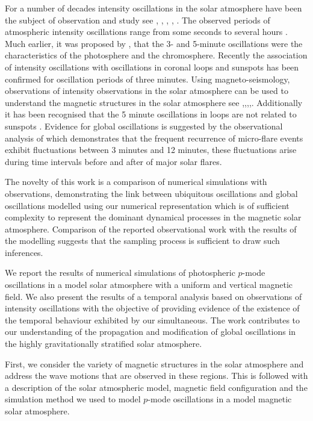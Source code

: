 \documentclass[linenumbers]{aastex63}
\begin{document}
For a number of decades intensity oscillations in the solar atmosphere have been the subject of observation and study see \citet{Banerjee2011}, \citet{deMoortel2009}, \citet{Mathioudakis2013}, \citet{Ruderman2009}, \citet{Wang2011}. The observed periods of atmospheric intensity oscillations range from some seconds to several hours \citet{Auchere2014}. Much earlier, it was proposed by \citet{Jensen1963}, that the 3- and 5-minute oscillations were the characteristics of the photosphere and the chromosphere. Recently the association of intensity oscillations with oscillations in coronal loops and sunspots has been confirmed for oscillation periods of three minutes. Using magneto-seismology, observations of intensity observations in the solar atmosphere can be used to understand the magnetic structures in the solar atmosphere see \citet{Roberts1984},\citet{Banerjee2007},\citet{Zaqarashvili2007},\citet{Erdelyi2008},\citet{Verth2010}.  Additionally it has been recognised that the 5 minute oscillations in loops are not related to sunspots \citet{deMoortel2002}. Evidence for global oscillations is suggested by the observational analysis of \citet{Gyenge2018} which demonstrates that the frequent recurrence of micro-flare events exhibit fluctuations between 3 minutes and 12 minutes, these fluctuations arise during time intervals before and after of major solar flares.
 


The novelty of this work is a comparison of numerical simulations with observations, demonstrating the link between ubiquitous oscillations and global oscillations modelled using our numerical representation which is of sufficient complexity to represent the dominant dynamical processes in the magnetic solar atmosphere. Comparison of the reported observational work with the results of the modelling suggests that the sampling process is sufficient to draw such inferences.



We report the results of numerical simulations of photospheric $p$-mode oscillations in a model solar atmosphere with a uniform and vertical magnetic field. We also present the results of a temporal analysis based on observations of intensity oscillations with the objective of providing evidence of the existence of the temporal behaviour exhibited by our simultaneous. The work contributes to our understanding of the propagation and modification of global oscillations in the highly gravitationally stratified solar atmosphere. 

First, we consider the variety of magnetic structures in the solar atmosphere and address the wave motions that are observed in these regions. This is followed with a description of the solar atmospheric model, magnetic field configuration and the simulation method we used to model $p$-mode oscillations in a model magnetic solar atmosphere.
\end{document}
